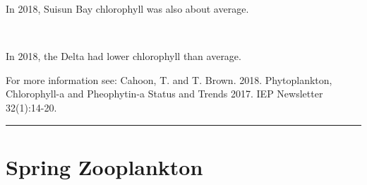 \documentclass[
]{book}
\begin{document}
\begin{panel-grid}
\begin{columns-nocenter}
\begin{column40}
\end{column40}

\begin{column800}

In 2018, Suisun Bay chlorophyll was also about average.

\end{column800}

\begin{column40}

~

\end{column40}

\begin{column800}

In 2018, the Delta had lower chlorophyll than average.

\end{column800}

\end{columns-nocenter}

\end{panel-grid}

\begin{disclaimer}
For more information see: Cahoon, T. and T. Brown. 2018. Phytoplankton,
Chlorophyll-a and Pheophytin-a Status and Trends 2017. IEP Newsletter
32(1):14-20.
\end{disclaimer}

\begin{center}\rule{0.5\linewidth}{0.5pt}\end{center}

\hypertarget{spring-zooplankton}{%
\section{Spring Zooplankton}\label{spring-zooplankton}}
\end{document}

